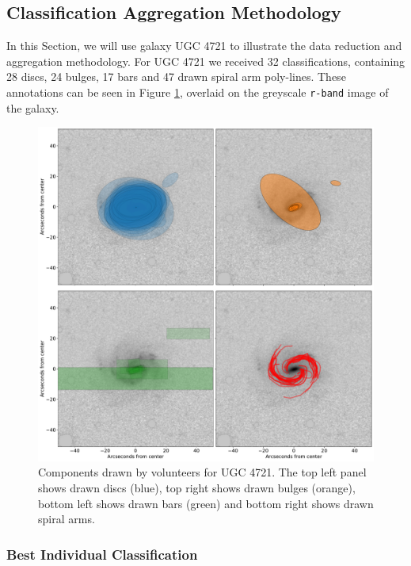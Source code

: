 \documentclass[../main.tex]{subfiles}
\begin{document}
\subsection{Classification Aggregation Methodology}

In this Section, we will use galaxy UGC 4721 to illustrate the data reduction and aggregation methodology. For UGC 4721 we received 32 classifications, containing 28 discs, 24 bulges, 17 bars and 47 drawn spiral arm poly-lines. These annotations can be seen in Figure \ref{fig:drawn_shapes}, overlaid on the greyscale \texttt{r-band} image of the galaxy.

\begin{figure}
  \includegraphics[width=17.3cm]{images__method/drawn_shapes.pdf}
  \caption{Components drawn by volunteers for UGC 4721. The top left panel shows drawn discs (blue), top right shows drawn bulges (orange), bottom left shows drawn bars (green) and bottom right shows drawn spiral arms. }
  \label{fig:drawn_shapes}
\end{figure}

\subsubsection{Best Individual Classification}
\end{document}
